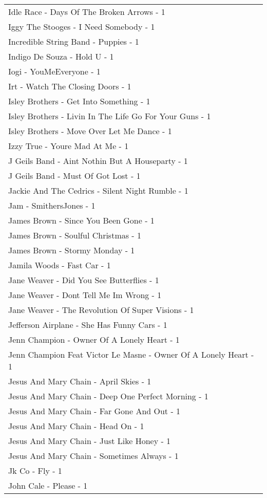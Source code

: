 \documentclass[
]{article}
\begin{document}
\begin{longtable}{l}
Idle Race - Days Of The Broken Arrows - 1 \\ 
Iggy The Stooges - I Need Somebody - 1 \\ 
Incredible String Band - Puppies - 1 \\ 
Indigo De Souza - Hold U - 1 \\ 
Iogi - YouMeEveryone - 1 \\ 
Irt - Watch The Closing Doors - 1 \\ 
Isley Brothers - Get Into Something - 1 \\ 
Isley Brothers - Livin In The Life Go For Your Guns - 1 \\ 
Isley Brothers - Move Over Let Me Dance - 1 \\ 
Izzy True - Youre Mad At Me - 1 \\ 
J Geils Band - Aint Nothin But A Houseparty - 1 \\ 
J Geils Band - Must Of Got Lost - 1 \\ 
Jackie And The Cedrics - Silent Night Rumble - 1 \\ 
Jam - SmithersJones - 1 \\ 
James Brown - Since You Been Gone - 1 \\ 
James Brown - Soulful Christmas - 1 \\ 
James Brown - Stormy Monday - 1 \\ 
Jamila Woods - Fast Car - 1 \\ 
Jane Weaver - Did You See Butterflies - 1 \\ 
Jane Weaver - Dont Tell Me Im Wrong - 1 \\ 
Jane Weaver - The Revolution Of Super Visions - 1 \\ 
Jefferson Airplane - She Has Funny Cars - 1 \\ 
Jenn Champion - Owner Of A Lonely Heart - 1 \\ 
Jenn Champion Feat Victor Le Masne - Owner Of A Lonely Heart - 1 \\ 
Jesus And Mary Chain - April Skies - 1 \\ 
Jesus And Mary Chain - Deep One Perfect Morning - 1 \\ 
Jesus And Mary Chain - Far Gone And Out - 1 \\ 
Jesus And Mary Chain - Head On - 1 \\ 
Jesus And Mary Chain - Just Like Honey - 1 \\ 
Jesus And Mary Chain - Sometimes Always - 1 \\ 
Jk Co - Fly - 1 \\ 
John Cale - Please - 1 \\ 

\end{longtable}
\end{document}
